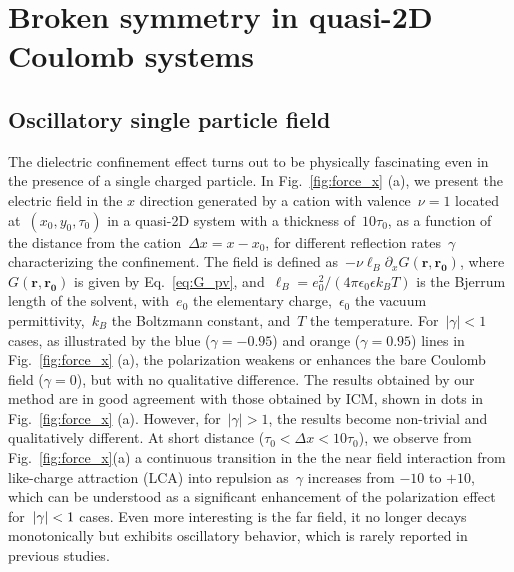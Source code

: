 \section{Broken symmetry in quasi-2D Coulomb systems}\label{sec::ssb}

\subsection{Oscillatory single particle field}

The dielectric confinement effect turns out to be physically fascinating even in the presence of a single charged particle. 
In Fig.~\ref{fig:force_x} (a), we present the electric field in the $x$ direction generated by a cation with valence~$\nu=1$ located at~$(x_0, y_0, \tau_0)$ in a quasi-2D system with a thickness of~$10\tau_0$, as a function of the distance from the cation~$\Delta x=x-x_0$, for different reflection rates~$\gamma$ characterizing the confinement. 
The field is defined as~$-\nu\ell_B\partial_x G(\mathbf{r}, \mathbf{r_0})$, where~$G(\mathbf{r}, \mathbf{r_0})$ is given by Eq.~\eqref{eq:G_pv}, and~$\ell_B=e_0^2/(4\pi\epsilon_0\epsilon k_B T)$ is the Bjerrum length of the solvent, with~$e_0$ the elementary charge,~$\epsilon_0$ the vacuum permittivity,~$k_B$ the Boltzmann constant, and~$T$ the temperature. 
For~$\vert\gamma\vert<1$ cases, as illustrated by the blue ($\gamma=-0.95$) and orange ($\gamma=0.95$) lines in Fig.~\ref{fig:force_x} (a), the polarization weakens or enhances the bare Coulomb field ($\gamma=0$), but with no qualitative difference. 
The results obtained by our method are in good agreement with those obtained by ICM, shown in dots in Fig.~\ref{fig:force_x} (a). 
However, for~$\vert\gamma\vert>1$, the results become non-trivial and qualitatively different. 
At short distance ($\tau_0<\Delta x < 10\tau_0$), we observe from Fig.~\ref{fig:force_x}(a) a continuous transition in the the near field interaction from like-charge attraction (LCA) into repulsion as~$\gamma$ increases from $-10$ to $+10$,
which can be understood as a significant enhancement of the polarization effect for~$\lvert\gamma\rvert<1$ cases.
Even more interesting is the far field, it no longer decays monotonically but exhibits oscillatory behavior, which is rarely reported in previous studies.

